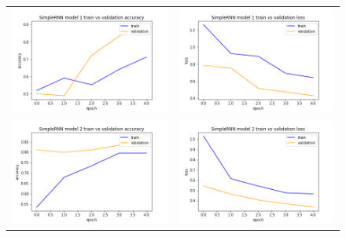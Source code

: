 \begin{figure}
   \centering
\begin{tabular}{cc}
\includegraphics[width=6.5cm]{images/classifier/model-output-simple-rnn-339/model-1-train-vs-validation-accuracy}&
\includegraphics[width=6.5cm]{images/classifier/model-output-simple-rnn-339/model-1-train-vs-validation-loss}\\

\includegraphics[width=6.5cm]{images/classifier/model-output-simple-rnn-339/model-2-train-vs-validation-accuracy}&
\includegraphics[width=6.5cm]{images/classifier/model-output-simple-rnn-339/model-2-train-vs-validation-loss}\\


\end{tabular}
\end{figure}
